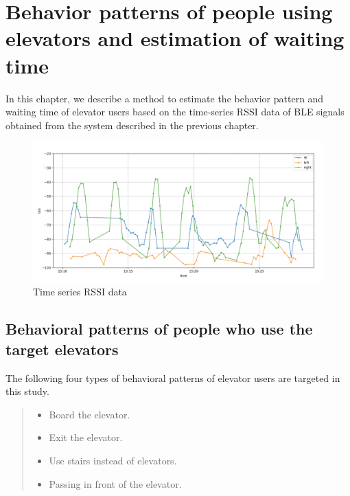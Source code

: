 
\section{Behavior patterns of people using elevators and estimation of waiting time}
In this chapter, we describe a method to estimate the behavior pattern and waiting time of elevator users based on the time-series RSSI data of BLE signals obtained from the system described in the previous chapter. 

\begin{figure}[t]
\centering
\includegraphics[width=1.0\hsize]{img/ble_rssi_original.png}
\caption{Time series RSSI data}
\label{fig:ble_rssi_original}
\end{figure}

\subsection{Behavioral patterns of people who use the target elevators}

The following four types of behavioral patterns of elevator users are targeted in this study.

\begin{quote}
 \begin{itemize}
  \item Board the elevator.
  \item Exit the elevator.
  \item Use stairs instead of elevators.
  \item Passing in front of the elevator.
 \end{itemize}
\end{quote}

